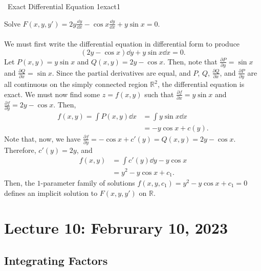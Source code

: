         \begin{example}{\Difficulty\,\Difficulty\,\,Exact Differential Equation 1}{exact1}

            Solve \(F(x,y,y')=2y\frac{\dd y}{\dd x}-\cos x\frac{\dd y}{\dd x}+y\sin x=0\).
            \\
            \\
            We must first write the differential equation in differential form to produce
            \begin{equation*}
                (2y-\cos x)\dd y+y\sin x\dd x=0.
            \end{equation*}
            Let \(P(x,y)=y\sin x\) and \(Q(x,y)=2y-\cos x\).
            Then, note that \(\frac{\partial P}{\partial y}=\sin x\) and \(\frac{\partial Q}{\partial x}=\sin x\). Since the partial derivatives are equal, and \(P\), \(Q\), \(\frac{\partial Q}{\partial x}\), and \(\frac{\partial P}{\partial y}\) are all continuous on the simply connected region \(\mathbb{R}^2\), the differential equation is exact. We must now find some \(z=f(x,y)\) such that \(\frac{\partial f}{\partial x}=y\sin x\) and \(\frac{\partial f}{\partial y}=2y-\cos x\). Then,
            \begin{align*}
                f(x,y)=\int P(x,y)\dd x&=\int y\sin x\dd x \\
                &=-y\cos x+c(y).
            \end{align*}
            Note that, now, we have \(\frac{\partial f}{\partial y}=-\cos x+c'(y)=Q(x,y)=2y-\cos x\). Therefore, \(c'(y)=2y\), and
            \begin{align*}
                f(x,y)&=\int c'(y)\dd y-y\cos x \\
                &=y^2-y\cos x+c_1.
            \end{align*}
            Then, the \(1\)-parameter family of solutions \(f(x,y,c_1)=y^2-y\cos x+c_1=0\) defines an implicit solution to \(F(x,y,y')\) on \(\mathbb{R}\).
        \end{example}

\pagebreak

\section{Lecture 10: Februrary 10, 2023}

    \subsection{Integrating Factors}

